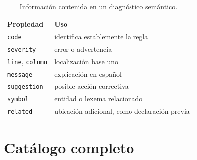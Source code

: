 \documentclass[11pt,letterpaper,oneside]{report}
\newcommand{\codigo}[1]{\texttt{#1}}
\begin{document}
\begin{table}[H]
\centering
\begin{tabularx}{\textwidth}{lY}
\toprule
Propiedad & Uso \\
\midrule
\codigo{code} & identifica establemente la regla \\
\codigo{severity} & error o advertencia \\
\codigo{line}, \codigo{column} & localización base uno \\
\codigo{message} & explicación en español \\
\codigo{suggestion} & posible acción correctiva \\
\codigo{symbol} & entidad o lexema relacionado \\
\codigo{related} & ubicación adicional, como declaración previa \\
\bottomrule
\end{tabularx}
\caption{Información contenida en un diagnóstico semántico.}
\end{table}

\section{Catálogo completo}
\end{document}
